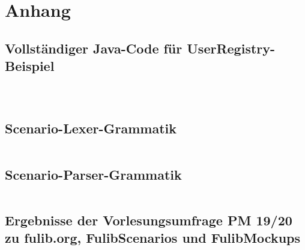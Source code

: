 \chapter{Anhang}\label{ch:appendix}

\section{Vollständiger Java-Code für UserRegistry-Beispiel}\label{sec:user-registry-full}

\begin{center}
    \inputminted[breaklines]{java}{chapter/fulib-scenarios/java/User.java}

    \inputminted[breaklines]{java}{chapter/fulib-scenarios/java/UserRegistry.java}

    \inputminted[breaklines]{java}{chapter/fulib-scenarios/java/UserRegistryTest.java}
\end{center}

\section{Scenario-Lexer-Grammatik}\label{sec:scenario-lexer-grammar}

\inputminted[breaklines]{antlr}{chapter/fulib-scenarios/grammars/ScenarioLexer.g4}

\section{Scenario-Parser-Grammatik}\label{sec:scenario-parser-grammar}

\inputminted[breaklines]{antlr}{chapter/fulib-scenarios/grammars/ScenarioParser.g4}

\section{Ergebnisse der Vorlesungsumfrage PM 19/20 zu fulib.org, FulibScenarios und FulibMockups}\label{sec:survey-results}

